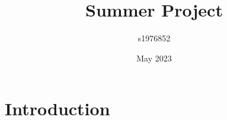 \documentclass{article}
\title{Summer Project}
\author{s1976852 }
\date{May 2023}
\begin{document}
\maketitle

\section{Introduction}
\end{document}

